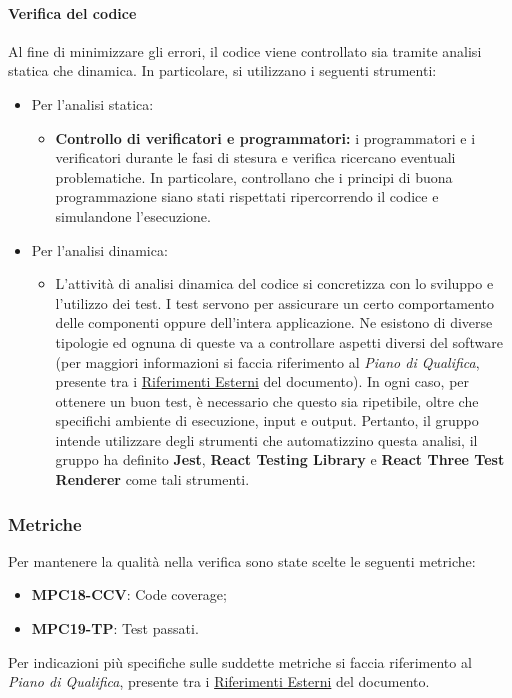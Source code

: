 \paragraph{Verifica del codice}
Al fine di minimizzare gli errori, il codice viene controllato sia tramite analisi statica che dinamica. In particolare, si utilizzano i seguenti strumenti:
\begin{itemize}
    \item Per l'analisi statica: 
        \begin{itemize}
            \item \textbf{Controllo di verificatori e programmatori:} i programmatori e i verificatori durante le fasi di stesura e verifica ricercano eventuali problematiche. In particolare, controllano che i principi di buona programmazione siano stati rispettati ripercorrendo il codice e simulandone l'esecuzione.
        \end{itemize}
    \item Per l'analisi dinamica: 
        \begin{itemize}
            \item L’attività di analisi dinamica del codice si concretizza con lo sviluppo e l’utilizzo dei test. I test servono per assicurare un certo comportamento delle componenti oppure dell’intera applicazione. Ne esistono di diverse tipologie ed ognuna di queste va a controllare aspetti diversi del software (per maggiori informazioni si faccia riferimento al \textit{Piano di Qualifica}, presente tra i \hyperref[sec:riferimenti_esterni]{Riferimenti Esterni} del documento). In ogni caso, per ottenere un buon test, è necessario che questo sia ripetibile, oltre che specifichi ambiente di esecuzione, input e output. Pertanto, il gruppo intende utilizzare degli strumenti che automatizzino questa analisi, il gruppo ha definito \textbf{Jest}, \textbf{React Testing Library} e \textbf{React Three Test Renderer} come tali strumenti.
        \end{itemize}
\end{itemize}

\subsubsection{Metriche}\label{sec:processi_di_supporto:verifica:metriche}
Per mantenere la qualità nella verifica sono state scelte le seguenti metriche:
\begin{itemize}
    \item \textbf{MPC18-CCV}: Code coverage;
    \item \textbf{MPC19-TP}: Test passati.
\end{itemize}
Per indicazioni più specifiche sulle suddette metriche si faccia riferimento al \textit{Piano di Qualifica}, presente tra i \hyperref[sec:riferimenti_esterni]{Riferimenti Esterni} del documento.

